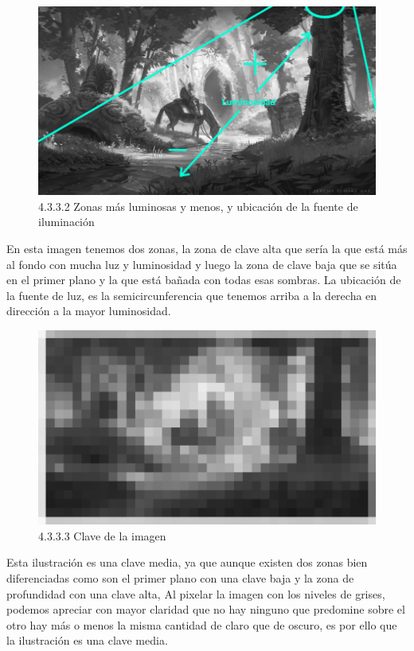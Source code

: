 \documentclass[12pt]{article}
\begin{document}
    \begin{figure}[H]
      \centering
      \includegraphics[width=\textwidth]{images/Saúl/Sección 3/EA_img3_3Claroscuro_2Luminosidad.png}
      \caption{\small 4.3.3.2 Zonas más luminosas y menos, y ubicación de la fuente de iluminación}
    \end{figure}

En esta imagen tenemos dos zonas, la zona de clave alta que sería la que está más al fondo con mucha luz y luminosidad y luego la zona de clave baja que se sitúa en el primer plano y la que está bañada con todas esas sombras. La ubicación de la fuente de luz, es la semicircunferencia que tenemos arriba a la derecha en dirección a la mayor luminosidad.

    \begin{figure}[H]
      \centering
      \includegraphics[width=\textwidth]{images/Saúl/Sección 3/EA_img3_3Claroscuro_3Clave.png}
      \caption{\small 4.3.3.3 Clave de la imagen}
    \end{figure}

Esta ilustración es una clave media, ya que aunque existen dos zonas bien diferenciadas como son el primer plano con una clave baja y la zona de profundidad con una clave alta, Al pixelar la imagen con los niveles de grises, podemos apreciar con mayor claridad que no hay ninguno que predomine sobre el otro hay más o menos la misma cantidad de claro que de oscuro, es por ello que la ilustración es una clave media.
\end{document}
